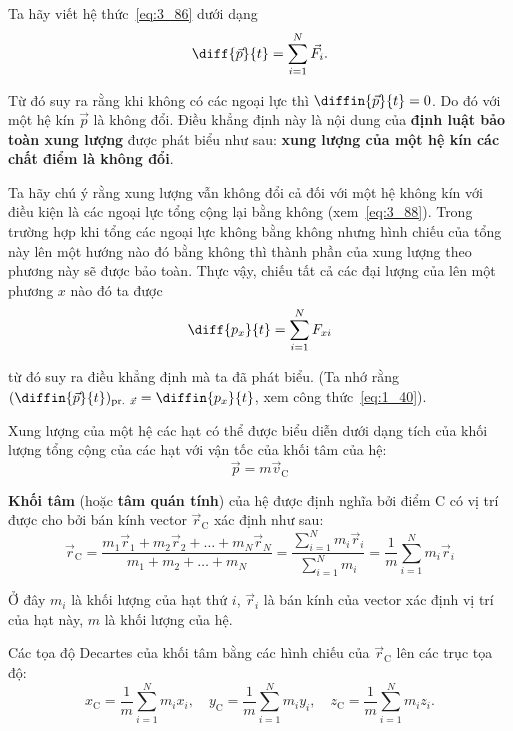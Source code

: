 Ta hãy viết hệ thức~\eqref{eq:3_86} dưới dạng 
\begin{equation}\label{eq:3_88}
\diff{\vec{p}}{t} = \sum_{i=1}^{N} \vec{F}_i.
\end{equation}

\noindent
Từ đó suy ra rằng khi không có các ngoại lực thì $\diffin{\vec{p}}{t}=0$. Do đó với một hệ kín $\vec{p}$ là không đổi. Điều khẳng định này là nội dung của \textbf{định luật bảo toàn xung lượng} được phát biểu như sau: \textbf{xung lượng của một hệ kín các chất điểm là không đổi}.

Ta hãy chú ý rằng xung lượng vẫn không đổi cả đối với một hệ không kín với điều kiện là các ngoại lực tổng cộng lại bằng không (xem~\eqref{eq:3_88}). Trong trường hợp khi tổng các ngoại lực không bằng không nhưng hình chiếu của tổng này lên một hướng nào đó bằng không thì thành phần của xung lượng theo phương này sẽ được bảo toàn. Thực vậy, chiếu tất cả các đại lượng của  lên một phương $x$ nào đó ta được 
\begin{equation}\label{eq:3_89}
\diff{p_x}{t} = \sum_{i=1}^{N} F_{xi}
\end{equation}

\noindent
từ đó suy ra điều khẳng định mà ta đã phát biểu. (Ta nhớ rằng $(\diffin{\vec{p}}{t})_{\text{pr. }\vec{x}}=\diffin{p_x}{t}$, xem công thức~\eqref{eq:1_40}).

Xung lượng của một hệ các hạt có thể được biểu diễn dưới dạng tích của khối lượng tổng cộng của các hạt với vận tốc của khối tâm của hệ:
\begin{equation}\label{eq:3_90}
\vec{p} = m\vec{v}_{\text{C}}
\end{equation}

\textbf{Khối tâm} (hoặc \textbf{tâm quán tính}) của hệ được định nghĩa bởi điểm C có vị trí được cho bởi bán kính vector $\vec{r}_{\text{C}}$ xác định như sau:
\begin{equation}\label{eq:3_91}
\vec{r}_{\text{C}} = \frac{m_1\vec{r}_1+m_2\vec{r}_2+\ldots+m_N\vec{r}_N}{m_1+m_2+\ldots+m_N} = \frac{\sum_{i=1}^N m_i\vec{r}_i}{\sum_{i=1}^N m_i} = \frac{1}{m} \sum_{i=1}^N m_i\vec{r}_i
\end{equation}

\noindent
Ở đây $m_i$  là khối lượng của hạt thứ $i$, $\vec{r}_i$ là bán kính của vector xác định vị trí của hạt này, $m$ là khối lượng của hệ.

Các tọa độ Decartes của khối tâm bằng các hình chiếu của $\vec{r}_{\text{C}}$ lên các trục tọa độ:
\begin{equation}\label{eq:3_92}
x_{\text{C}} = \frac{1}{m} \sum_{i=1}^N m_i x_i,\quad y_{\text{C}} = \frac{1}{m} \sum_{i=1}^N m_i y_i,\quad
z_{\text{C}} = \frac{1}{m} \sum_{i=1}^N m_i z_i.
\end{equation}

